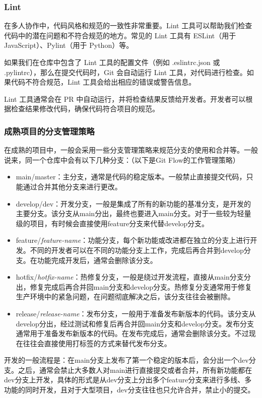 \documentclass[../main.tex]{subfiles}
\begin{document}
\subsubsection{Lint}

在多人协作中，代码风格和规范的一致性非常重要。Lint 工具可以帮助我们检查代码中的潜在问题和不符合规范的地方。常见的 Lint 工具有 ESLint（用于 JavaScript）、Pylint（用于 Python）等。

如果我们在仓库中包含了 Lint 工具的配置文件（例如 .eslintrc.json 或 .pylintrc），那么在提交代码时，Git 会自动运行 Lint 工具，对代码进行检查。如果代码不符合规范，Lint 工具会给出相应的错误或警告信息。

Lint 工具通常会在 PR 中自动运行，并将检查结果反馈给开发者。开发者可以根据检查结果修改代码，确保代码符合项目的规范。

\subsubsection{成熟项目的分支管理策略}

在成熟的项目中，一般会采用一些分支管理策略来规范分支的使用和合并等。一般说来，同一个仓库中会有以下几种分支：（以下是Git Flow的工作管理策略）
\begin{itemize}
  \item main/master：主分支，通常是代码的稳定版本。一般禁止直接提交代码，只能通过合并其他分支来进行更改。
  \item develop/dev：开发分支，一般是集成了所有的新功能的基准分支，是开发的主要分支。该分支从main分出，最终也要进入main分支。对于一些较为轻量级的项目，有时候会直接使用feature分支来代替develop分支。
  \item feature/\textit{feature-name}：功能分支，每个新功能或改进都在独立的分支上进行开发。不同的开发者可以在不同的功能分支上工作，完成后再合并到develop分支。在功能完成开发后，通常会删除该分支。
  \item hotfix/\textit{hotfix-name}：热修复分支，一般是绕过开发流程，直接从main分支分出，修复完成后再合并回main分支和develop分支。热修复分支通常用于修复生产环境中的紧急问题，在问题彻底解决之后，该分支往往会被删除。
  \item release/\textit{release-name}：发布分支，一般用于准备发布新版本的代码。该分支从develop分出，经过测试和修复后再合并回main分支和develop分支。发布分支通常用于准备发布新版本的代码。在发布完成后，通常会删除该分支。不过现在往往会直接使用打标签的方式来替代发布分支。
\end{itemize}

开发的一般流程是：在main分支上发布了第一个稳定的版本后，会分出一个dev分支。之后，通常会禁止大多数人对main进行直接提交或者合并，所有新功能都在dev分支上开发，具体的形式是从dev分支上分出多个feature分支来进行多线、多功能的同时开发，且对于大型项目，dev分支往往也只允许合并，禁止小的提交。
\end{document}
